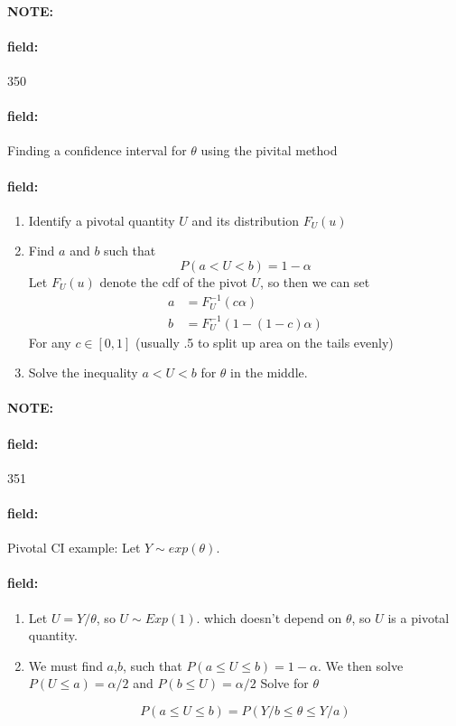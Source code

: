 \documentclass[12pt]{article}
\newenvironment{note}{\paragraph{NOTE:}}{}
\newenvironment{field}{\paragraph{field:}}{}
\begin{document}
\begin{note}
    \begin{field}
        \tiny 350
    \end{field}
    \begin{field}
        Finding a confidence interval for $\theta$ using the pivital method
    \end{field}
    \begin{field}
        \begin{enumerate}
          \item Identify a pivotal quantity $U$ and its distribution $F_U(u)$
          \item Find $a$ and $b$ such that $$ P(a < U < b)= 1 - \alpha$$
          Let $F_U(u)$ denote the cdf of the pivot $U$, so then we can set \begin{align*}
            a &= F_U^{-1}(c \alpha)\\
            b &= F_U^{-1}(1 - (1 - c)\alpha)
        \end{align*}
        For any $c \in [0,1]$ (usually .5 to split up area on the tails evenly)
        \item Solve the inequality $a < U < b$ for $\theta$ in the middle.
        \end{enumerate}
    \end{field}
\end{note}

\begin{note}
    \begin{field}
        \tiny 351
    \end{field}
    \begin{field}
        Pivotal CI example: Let $Y \sim exp(\theta)$.

    \end{field}
    \begin{field}
        \begin{enumerate}
          \item Let $U = Y/\theta$, so $U \sim Exp(1)$. which doesn't depend on $\theta$, so $U$ is a pivotal quantity.
          \item We must find $a$,$b$, such that $P(a \leq U \leq b) = 1- \alpha$.
          We then solve $P(U \leq a) = \alpha/2$ and $P(b \leq U) = \alpha/2$
          Solve for $\theta$

          $$ P(a \leq U \leq b) = P(Y/b \leq \theta \leq Y/a) $$
        \end{enumerate}
    \end{field}
\end{note}
\end{document}
